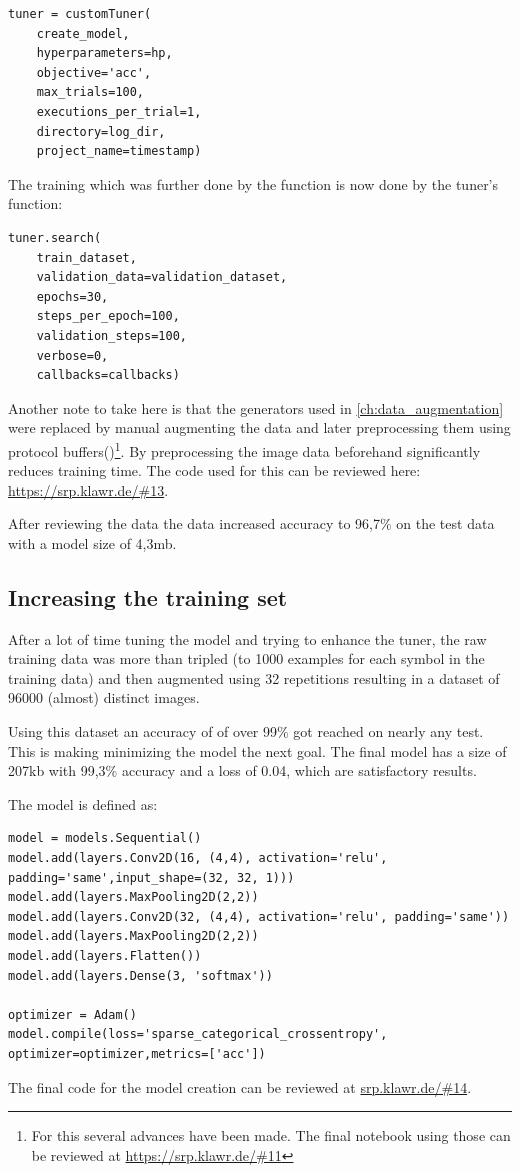 \begin{lstlisting}
tuner = customTuner(
    create_model,
    hyperparameters=hp,
    objective='acc',
    max_trials=100,
    executions_per_trial=1,
    directory=log_dir,
    project_name=timestamp)
\end{lstlisting}

The training which was further done by the  function is now done by the tuner's  function:

\begin{lstlisting}
tuner.search(
    train_dataset,
    validation_data=validation_dataset,
    epochs=30,
    steps_per_epoch=100,
    validation_steps=100,
    verbose=0,
    callbacks=callbacks)
\end{lstlisting}

Another note to take here is that the generators used in \ref{ch:data_augmentation} were replaced by manual augmenting the data and later preprocessing them using protocol buffers()\footnote{For this several advances have been made. The final notebook using those can be reviewed at \url{https://srp.klawr.de/\#11}}.
By preprocessing the image data beforehand significantly reduces training time.
The code used for this can be reviewed here: \url{https://srp.klawr.de/\#13}.

After reviewing the data the data increased accuracy to 96,7\% on the test data with a model size of 4,3mb.

\subsection{Increasing the training set}

After a lot of time tuning the model and trying to enhance the tuner, the raw training data was more than tripled (to 1000 examples for each symbol in the training data) and then augmented using 32 repetitions resulting in a dataset of 96000 (almost) distinct images.

Using this dataset an accuracy of of over 99\% got reached on nearly any test. This is making minimizing the model the next goal.
The final model has a size of 207kb with 99,3\% accuracy and a loss of 0.04, which are satisfactory results.

The model is defined as:
\begin{lstlisting}
model = models.Sequential()
model.add(layers.Conv2D(16, (4,4), activation='relu', padding='same',input_shape=(32, 32, 1)))
model.add(layers.MaxPooling2D(2,2))
model.add(layers.Conv2D(32, (4,4), activation='relu', padding='same'))
model.add(layers.MaxPooling2D(2,2))
model.add(layers.Flatten())
model.add(layers.Dense(3, 'softmax'))

optimizer = Adam()
model.compile(loss='sparse_categorical_crossentropy', optimizer=optimizer,metrics=['acc'])
\end{lstlisting}

The final code for the model creation can be reviewed at \url{srp.klawr.de/\#14}.